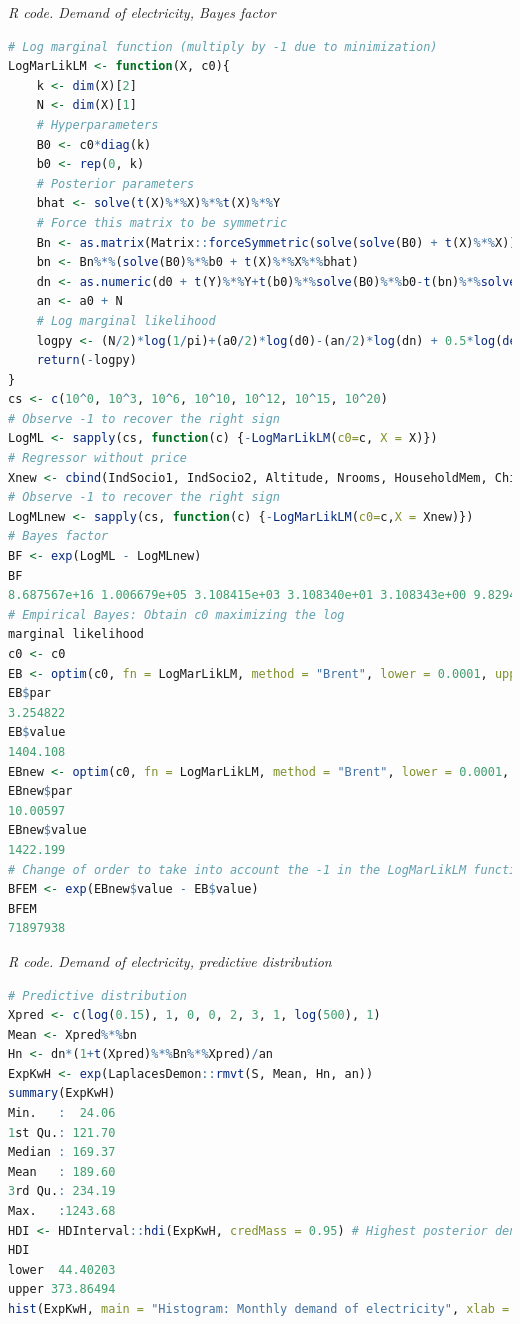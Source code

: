 \begin{tcolorbox}[enhanced,width=4.67in,center upper,
	fontupper=\large\bfseries,drop shadow southwest,sharp corners]
	\textit{R code. Demand of electricity, Bayes factor}
	\begin{VF}
		\begin{lstlisting}[language=R]
# Log marginal function (multiply by -1 due to minimization)
LogMarLikLM <- function(X, c0){
	k <- dim(X)[2]
	N <- dim(X)[1]	
	# Hyperparameters
	B0 <- c0*diag(k)
	b0 <- rep(0, k)
	# Posterior parameters
	bhat <- solve(t(X)%*%X)%*%t(X)%*%Y
	# Force this matrix to be symmetric
	Bn <- as.matrix(Matrix::forceSymmetric(solve(solve(B0) + t(X)%*%X))) 
	bn <- Bn%*%(solve(B0)%*%b0 + t(X)%*%X%*%bhat)
	dn <- as.numeric(d0 + t(Y)%*%Y+t(b0)%*%solve(B0)%*%b0-t(bn)%*%solve(Bn)%*%bn)
	an <- a0 + N
	# Log marginal likelihood
	logpy <- (N/2)*log(1/pi)+(a0/2)*log(d0)-(an/2)*log(dn) + 0.5*log(det(Bn)/det(B0)) + lgamma(an/2)-lgamma(a0/2)
	return(-logpy)
}
cs <- c(10^0, 10^3, 10^6, 10^10, 10^12, 10^15, 10^20)
# Observe -1 to recover the right sign
LogML <- sapply(cs, function(c) {-LogMarLikLM(c0=c, X = X)}) 
# Regressor without price
Xnew <- cbind(IndSocio1, IndSocio2, Altitude, Nrooms, HouseholdMem, Children, Lnincome, 1)
# Observe -1 to recover the right sign
LogMLnew <- sapply(cs, function(c) {-LogMarLikLM(c0=c,X = Xnew)})
# Bayes factor
BF <- exp(LogML - LogMLnew)
BF
8.687567e+16 1.006679e+05 3.108415e+03 3.108340e+01 3.108343e+00 9.829443e-02 3.108343e-04
# Empirical Bayes: Obtain c0 maximizing the log 
marginal likelihood
c0 <- c0 
EB <- optim(c0, fn = LogMarLikLM, method = "Brent", lower = 0.0001, upper = 10^6, X = X)
EB$par
3.254822
EB$value
1404.108
EBnew <- optim(c0, fn = LogMarLikLM, method = "Brent", lower = 0.0001, upper = 10^6, X = Xnew)
EBnew$par
10.00597
EBnew$value
1422.199
# Change of order to take into account the -1 in the LogMarLikLM function
BFEM <- exp(EBnew$value - EB$value) 
BFEM
71897938
\end{lstlisting}
	\end{VF}
\end{tcolorbox} 

\begin{tcolorbox}[enhanced,width=4.67in,center upper,
	fontupper=\large\bfseries,drop shadow southwest,sharp corners]
	\textit{R code. Demand of electricity, predictive distribution}
	\begin{VF}
		\begin{lstlisting}[language=R]
# Predictive distribution
Xpred <- c(log(0.15), 1, 0, 0, 2, 3, 1, log(500), 1)
Mean <- Xpred%*%bn
Hn <- dn*(1+t(Xpred)%*%Bn%*%Xpred)/an
ExpKwH <- exp(LaplacesDemon::rmvt(S, Mean, Hn, an))
summary(ExpKwH)
Min.   :  24.06  
1st Qu.: 121.70  
Median : 169.37  
Mean   : 189.60  
3rd Qu.: 234.19  
Max.   :1243.68 
HDI <- HDInterval::hdi(ExpKwH, credMass = 0.95) # Highest posterior density credible interval
HDI
lower  44.40203
upper 373.86494
hist(ExpKwH, main = "Histogram: Monthly demand of electricity", xlab = "Monthly kWh", col = "blue", breaks = 50)
\end{lstlisting}
	\end{VF}
\end{tcolorbox} 

